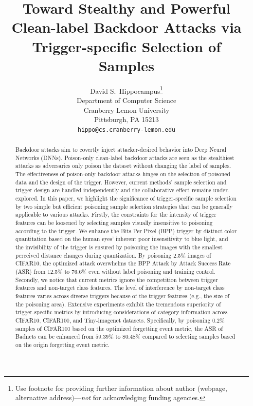 \documentclass{article}
\title{Toward Stealthy and Powerful Clean-label Backdoor Attacks via Trigger-specific Selection of Samples}
\author{%
  David S.~Hippocampus\thanks{Use footnote for providing further information
    about author (webpage, alternative address)---\emph{not} for acknowledging
    funding agencies.} \\
  Department of Computer Science\\
  Cranberry-Lemon University\\
  Pittsburgh, PA 15213 \\
  \texttt{hippo@cs.cranberry-lemon.edu} \\
}
\begin{document}
\maketitle


\begin{abstract}
Backdoor attacks aim to covertly inject attacker-desired behavior into Deep Neural Networks (DNNs). Poison-only clean-label backdoor attacks are seen as the stealthiest attacks as adversaries only poison the dataset without changing the label of samples. The effectiveness of poison-only backdoor attacks hinges on the selection of poisoned data and the design of the trigger. However, current methods' sample selection and trigger design are handled independently and the collaborative effect remains under-explored. In this paper, we highlight the significance of trigger-specific sample selection by two simple but efficient poisoning sample selection strategies that can be generally applicable to various attacks.
Firstly, the constraints for the intensity of trigger features can be loosened by selecting samples visually insensitive to poisoning according to the trigger. We enhance the Bits Per Pixel (BPP) trigger by distinct color quantitation based on the human eyes' inherent poor insensitivity to blue light, and the invisibility of the trigger is ensured by poisoning the images with the smallest perceived distance changes during quantization. By poisoning 2.5\% images of CIFAR10, the optimized attack overwhelms the BPP Attack by Attack Success Rate (ASR) from 12.5\% to 76.6\% even without label poisoning and training control. Secondly, we notice that current metrics ignore the competition between trigger features and non-target class features. The level of interference by non-target class features varies across diverse triggers because of the trigger features (e.g., the size of the poisoning area). Extensive experiments exhibit the tremendous superiority of trigger-specific metrics by introducing considerations of category information across CIFAR10, CIFAR100, and Tiny-imagenet datasets. Specifically, by poisoning 0.2\% samples of CIFAR100 based on the optimized forgetting event metric, the ASR of Badnets can be enhanced from \(59.39\%\) to \(80.48\%\) compared to selecting samples based on the origin forgetting event metric.
\end{abstract}
\end{document}
